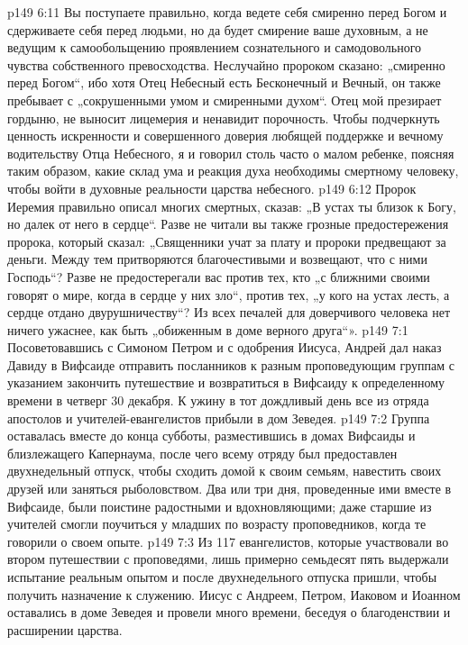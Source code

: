 \vs p149 6:11 Вы поступаете правильно, когда ведете себя смиренно перед Богом и сдерживаете себя перед людьми, но да будет смирение ваше духовным, а не ведущим к самообольщению проявлением сознательного и самодовольного чувства собственного превосходства. Неслучайно пророком сказано: „смиренно перед Богом“, ибо хотя Отец Небесный есть Бесконечный и Вечный, он также пребывает с „сокрушенными умом и смиренными духом“. Отец мой презирает гордыню, не выносит лицемерия и ненавидит порочность. Чтобы подчеркнуть ценность искренности и совершенного доверия любящей поддержке и вечному водительству Отца Небесного, я и говорил столь часто о малом ребенке, поясняя таким образом, какие склад ума и реакция духа необходимы смертному человеку, чтобы войти в духовные реальности царства небесного.
\vs p149 6:12 Пророк Иеремия правильно описал многих смертных, сказав: „В устах ты близок к Богу, но далек от него в сердце“. Разве не читали вы также грозные предостережения пророка, который сказал: „Священники учат за плату и пророки предвещают за деньги. Между тем притворяются благочестивыми и возвещают, что с ними Господь“? Разве не предостерегали вас против тех, кто „с ближними своими говорят о мире, когда в сердце у них зло“, против тех, „у кого на устах лесть, а сердце отдано двурушничеству“? Из всех печалей для доверчивого человека нет ничего ужаснее, как быть „обиженным в доме верного друга“».
\vs p149 7:1 Посоветовавшись с Симоном Петром и с одобрения Иисуса, Андрей дал наказ Давиду в Вифсаиде отправить посланников к разным проповедующим группам с указанием закончить путешествие и возвратиться в Вифсаиду к определенному времени в четверг 30 декабря. К ужину в тот дождливый день все из отряда апостолов и учителей\hyp{}евангелистов прибыли в дом Зеведея.
\vs p149 7:2 Группа оставалась вместе до конца субботы, разместившись в домах Вифсаиды и близлежащего Капернаума, после чего всему отряду был предоставлен двухнедельный отпуск, чтобы сходить домой к своим семьям, навестить своих друзей или заняться рыболовством. Два или три дня, проведенные ими вместе в Вифсаиде, были поистине радостными и вдохновляющими; даже старшие из учителей смогли поучиться у младших по возрасту проповедников, когда те говорили о своем опыте.
\vs p149 7:3 Из 117 евангелистов, которые участвовали во втором путешествии с проповедями, лишь примерно семьдесят пять выдержали испытание реальным опытом и после двухнедельного отпуска пришли, чтобы получить назначение к служению. Иисус с Андреем, Петром, Иаковом и Иоанном оставались в доме Зеведея и провели много времени, беседуя о благоденствии и расширении царства.
